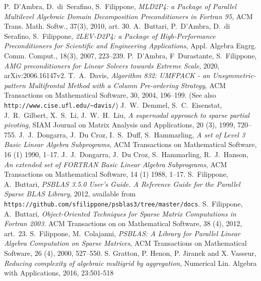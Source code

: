 \begin{thebibliography}{99}
P.~D'Ambra, D.~di~Serafino, S.~Filippone,
\emph{MLD2P4: a Package of Parallel Multilevel
Algebraic Domain Decomposition Preconditioners
in Fortran 95},  ACM Trans. Math. Softw., 37(3), 2010, art. 30.
%
A.~Buttari, P.~D'Ambra, D.~di Serafino, S.~Filippone,
\emph{2{LEV}-{D}2{P}4: a Package of High-Performance Preconditioners
for Scientific and Engineering Applications}, Appl. Algebra Engrg. Comm. Comput.,
18(3), 2007, 223--239.
%
P.~D'Ambra, F~Durastante, S.~Filippone, 
\emph{AMG preconditioners for Linear Solvers towards Extreme Scale}, 2020, arXiv:2006.16147v2.
%
T.~A.~Davis,
{\em Algorithm 832: UMFPACK - an Unsymmetric-pattern Multifrontal
Method with a Column Pre-ordering Strategy},
ACM Transactions on Mathematical Software, 30, 2004, 196--199.
(See also \texttt{http://www.cise.ufl.edu/{\textasciitilde}davis/})
%
J.~W.~Demmel, S.~C.~Eisenstat, J.~R.~Gilbert, X.~S.~Li, J.~W.~H.~Liu,
{\em A supernodal approach to sparse partial pivoting},
SIAM Journal on Matrix Analysis and Applications, 20 (3), 1999, 720--755.
%
J.~J.~Dongarra, J.~Du Croz, I.~S.~Duff, S.~Hammarling,
\emph{A set of Level 3 Basic Linear Algebra Subprograms},
ACM Transactions on Mathematical Software, 16 (1) 1990, 1--17.
%
J.~J.~Dongarra, J.~Du Croz, S.~Hammarling, R.~J.~Hanson,
\emph{An extended set of FORTRAN Basic Linear Algebra Subprograms},
ACM Transactions on Mathematical Software, 14 (1) 1988, 1--17.
%
%
%
S.~Filippone, A.~Buttari,
{\em PSBLAS 3.5.0 User's Guide. A Reference Guide for the Parallel Sparse BLAS Library}, 2012,
available from \texttt{https://github.com/sfilippone/psblas3/tree/master/docs}.
%
S.~Filippone, A.~Buttari,
{\em Object-Oriented Techniques for Sparse Matrix Computations in Fortran 2003}.
ACM Transactions on on Mathematical Software, 38 (4), 2012, art.~23.
%
S.~Filippone, M.~Colajanni,
{\em PSBLAS: A Library for Parallel Linear Algebra
Computation on Sparse Matrices},
ACM Transactions on Mathematical Software, 26 (4), 2000, 527--550.
%
S. Gratton, P. Henon, P. Jiranek and X. Vasseur,
  {\em Reducing complexity of algebraic multigrid by aggregation},
Numerical Lin. Algebra with Applications, 2016, 23:501-518


\end{thebibliography}
